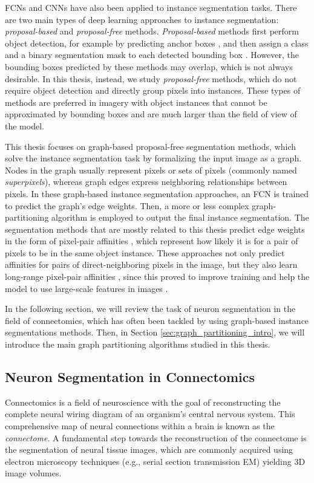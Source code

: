 FCNs and CNNs have also been applied to instance segmentation tasks.
There are two main types of deep learning approaches to instance segmentation: \emph{proposal-based} and \emph{proposal-free} methods. 
\emph{Proposal-based} methods first perform object detection, for example by predicting anchor boxes \cite{ren2015faster}, and then assign a class and a binary segmentation mask to each detected bounding box \cite{he2017mask,porzi2019seamless}.
However, the bounding boxes predicted by these methods may overlap, which is not always desirable. 
In this thesis, instead, we study \emph{proposal-free} methods, which do not require object detection and directly group pixels into instances. 
These types of methods are preferred in imagery with object instances that cannot be approximated by bounding boxes and are much larger than the field of view of the model. 

This thesis focuses on graph-based proposal-free segmentation methods, which solve the instance segmentation task by formalizing the input image as a graph. Nodes in the graph usually represent pixels or sets of pixels (commonly named \emph{superpixels}), whereas graph edges express neighboring relationships between pixels. In these graph-based instance segmentation approaches, an FCN is trained to predict the graph's edge weights. Then, a more or less complex graph-partitioning algorithm is employed to output the final instance segmentation. 
The segmentation methods that are mostly related to this thesis predict edge weights in the form of pixel-pair affinities \cite{Gao_2019_ICCV,liu2018affinity,lee2017superhuman}, which represent how likely it is for a pair of pixels to be in the same object instance. These approaches not only predict affinities for pairs of direct-neighboring pixels in the image, but they also learn long-range pixel-pair affinities , since this proved to improve training and help the model to use large-scale features in images \cite{lee2017superhuman}.

In the following section, we will review the task of neuron segmentation in the field of connectomics, which has often been tackled by using graph-based instance segmentations methods. Then, in Section \ref{sec:graph_partitioning_intro}, we will introduce the main graph partitioning algorithms studied in this thesis.



 
\subsection{Neuron Segmentation in Connectomics}
Connectomics is a field of neuroscience with the goal of reconstructing the complete neural wiring diagram of an organism's central nervous system. This comprehensive map of neural connections within a brain is known as the \emph{connectome}. A fundamental step towards the reconstruction of the connectome is the segmentation of neural tissue images, which are commonly acquired using electron microscopy techniques (e.g., serial section transmission EM) yielding 3D image volumes. 

